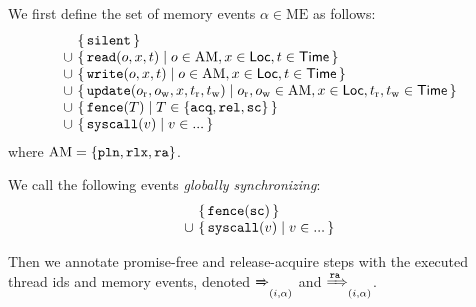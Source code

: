 \newcommand{\ME}{\textrm{ME}}
\newcommand{\AccMode}{\mathrm{AM}}
\newcommand{\mesilent}{\mathtt{silent}}
\newcommand{\meread}{\mathtt{read}}
\newcommand{\mewrite}{\mathtt{write}}
\newcommand{\meupdate}{\mathtt{update}}
\newcommand{\mefence}{\mathtt{fence}}
\newcommand{\mesyscall}{\mathtt{syscall}}
\newcommand{\mcths}{\mathtt{ths}}
\newcommand{\mcgsc}{\mathtt{gsc}}
\newcommand{\mcmem}{\mathtt{mem}}
\newcommand{\twomsg}[2]{\tup{#1\text{\small@}#2}}

\noindent
We first define the set of memory events $\alpha\in\ME$ as follows:
\[
\begin{array}{@{}c@{~}l@{}}
 & \setof{\mesilent} \\
\cup& \setof{\meread(o,x,t) \suchthat o\in\AccMode ,x\in\Loc,t\in\Time } \\
\cup& \setof{\mewrite(o,x,t) \suchthat o\in\AccMode,x\in\Loc,t\in\Time} \\
\cup& \setof{\meupdate(o_\lr,o_\lw,x,t_\lr,t_\lw) \suchthat o_\lr,o_\lw\in\AccMode,x\in\Loc,t_\lr,t_\lw\in\Time } \\
\cup& \setof{\mefence(T) \suchthat T \in \setofz{\acqo,\relo,\sco} } \\
\cup& \setof{\mesyscall(v) \suchthat v \in ... } \\
\end{array}
\]
where $\AccMode = \setofz{\pln,\rlx,\ra}$. %

We call the following events \emph{globally synchronizing}:
\[
\begin{array}{@{}c@{~}l@{}}
& \setof{\mefence(\sco) } \\
\cup& \setof{\mesyscall(v) \suchthat v \in ... } \\
\end{array}
\]

Then we annotate promise-free and release-acquire steps with 
the executed thread ids and memory events, denoted $\xRightarrow{}_{(i,\alpha)}$ and $\xRightarrow{\texttt{ra}}_{(i,\alpha)}$.

